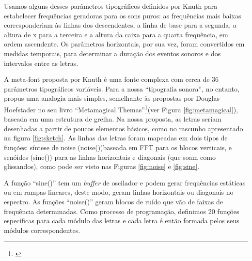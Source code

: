 Usamos alguns desses parâmetros tipográficos definidos por Knuth para estabelecer frequências geradoras para os sons puros: as frequências mais baixas corresponderiam às linhas dos descendentes, a linha de base para a segunda, a altura de x para a terceira e a altura da caixa para a quarta frequência, em ordem ascendente. Os parâmetros horizontais, por sua vez, foram convertidos em medidas temporais, para determinar a duração dos eventos sonoros e dos intervalos entre as letras.


A meta-font proposta por Knuth é uma fonte complexa com cerca de 36 parâmetros tipográficos variáveis. Para a nossa ``tipografia sonora'', no entanto, propus uma analogia mais simples, semelhante às propostas por Douglas Hoefstader no seu livro ``Metamagical Themas''\footnote{\cite{Metamagical1986}}(ver Figura \ref{fig:metamagical}), baseada em uma estrutura de grelha. Na nossa proposta, as letras seriam desenhadas a partir de poucos elementos básicos, como no rascunho apresentado na figura \ref{fig:sketch}. As linhas das letras foram mapeadas em dois tipos de funções: síntese de noise (noise())baseada em FFT para os blocos verticais, e senóides (sine()) para as linhas horizontais e diagonais (que soam como glissandos), como pode ser visto nas Figuras \ref{fig:noise} e \ref{fig:sine}. 




A função ``sine()'' tem um \emph{buffer} de oscilador e podem gerar frequências estáticas ou em rampas lineares, deste modo, geram linhas horizontais ou diagonais no espectro. As funções ``noise()'' geram blocos de ruído que vão de faixas de frequência determinadas. Como processo de programação, definimos 20 funções específicas para cada módulo das letras e cada letra é então formada pelos seus módulos correspondentes. 





